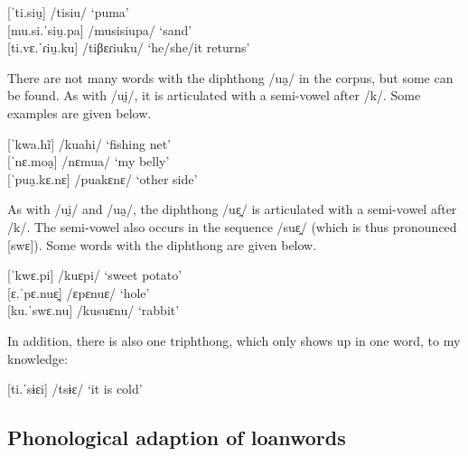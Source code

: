 \ea %
        {[}ˈti.siu̯] \tab\tab /tisiu/ \tab ‘puma’\\
	{[}mu.si.ˈsiu̯.pa] \tab /musisiupa/ \tab ‘sand’\\
	{[}ti.vɛ.ˈɾiu̯.ku] \tab /tiβɛɾiuku/ \tab ‘he/she/it returns’\\%
	\xe	
	
There are not many words with the diphthong /ua̯/ in the corpus, but some can be found. As with /ui̯/, it is articulated with a semi-vowel after /k/. Some examples are given below.

\ea %
        {[}ˈkwa.hĩ] \tab /kuahi/ \tab ‘fishing net’\\
	{[}ˈnɛ.moa̯] \tab /nɛmua/ \tab ‘my belly’\\
	{[}ˈpua̯.kɛ.nɛ] \tab /puakɛnɛ/ \tab ‘other side’\\ %
	\xe
	
As with /ui̯/ and /ua̯/, the diphthong /uɛ̯/ is articulated with a semi-vowel after /k/. The semi-vowel also occurs in the sequence /suɛ̯/ (which is thus pronounced [swɛ]). Some words with the diphthong are given below.

\ea %
        {[}ˈkwɛ.pi] \tab /kuɛpi/ \tab ‘sweet potato’\\
	{[}ɛ.ˈpɛ.nuɛ̯] \tab /ɛpɛnuɛ/ \tab ‘hole’\\
	{[}ku.ˈswɛ.nu] \tab /kusuɛnu/ \tab ‘rabbit’\\%
	\xe	


In addition, there is also one triphthong, which only shows up in one word, to my knowledge:

\ea %
        {[}ti.ˈsɨɛi] \tab /tsɨɛ/ \tab ‘it is cold’\\%
	\xe	


\subsection{Phonological adaption of loanwords} \label{SoundsLoans}

